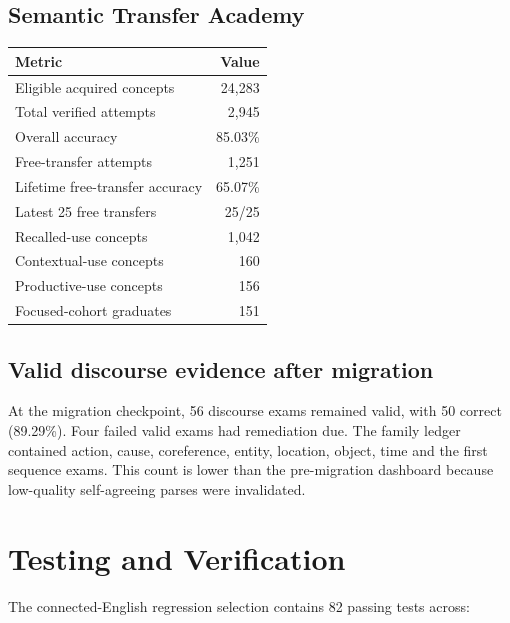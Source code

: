 \documentclass[11pt,a4paper]{article}
\begin{document}
\subsection{Semantic Transfer Academy}

\begin{longtable}{p{} r}
\toprule
Metric & Value \\
\midrule
\endhead
Eligible acquired concepts & 24,283 \\
Total verified attempts & 2,945 \\
Overall accuracy & 85.03\% \\
Free-transfer attempts & 1,251 \\
Lifetime free-transfer accuracy & 65.07\% \\
Latest 25 free transfers & 25/25 \\
Recalled-use concepts & 1,042 \\
Contextual-use concepts & 160 \\
Productive-use concepts & 156 \\
Focused-cohort graduates & 151 \\
\bottomrule
\end{longtable}

\subsection{Valid discourse evidence after migration}

At the migration checkpoint, 56 discourse exams remained valid, with 50 correct
(89.29\%). Four failed valid exams had remediation due. The family ledger contained action,
cause, coreference, entity, location, object, time and the first sequence exams. This count is
lower than the pre-migration dashboard because low-quality self-agreeing parses were invalidated.

\section{Testing and Verification}

The connected-English regression selection contains 82 passing tests across:
\end{document}
